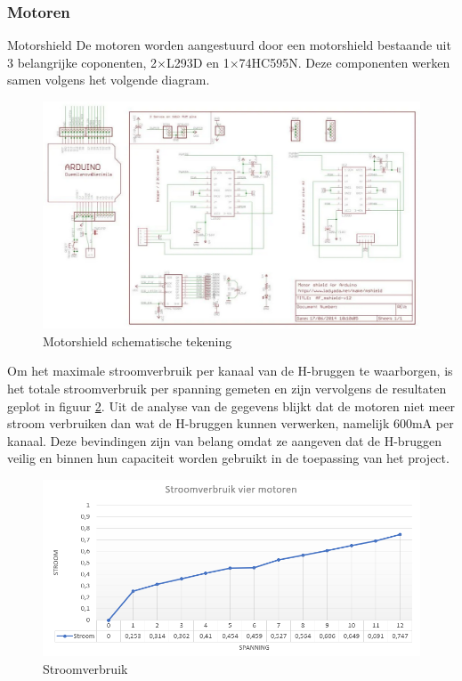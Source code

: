 \subsubsection{Motoren}
Motorshield
De motoren worden aangestuurd door een motorshield bestaande uit 3 belangrijke coponenten, 2×L293D\cite{h-brug} en 1×74HC595N\cite{shiftregister}. Deze componenten werken samen volgens het volgende diagram.
\begin{figure}[h]
    \centering
    \includegraphics[scale = 0.3]{Media/Figuren/Motorshield_SCHEM.png}
    \caption{Motorshield schematische tekening}
    \label{schematic-Motorshield}   
    \end{figure}

Om het maximale stroomverbruik per kanaal van de H-bruggen te waarborgen, is het totale stroomverbruik per spanning gemeten en zijn vervolgens de resultaten geplot in figuur \ref{Stroomverbruik}. Uit de analyse van de gegevens blijkt dat de motoren niet meer stroom verbruiken dan wat de H-bruggen kunnen verwerken, namelijk 600mA per kanaal. Deze bevindingen zijn van belang omdat ze aangeven dat de H-bruggen veilig en binnen hun capaciteit worden gebruikt in de toepassing van het project.

\begin{figure}[h]
    \centering
    \includegraphics[scale = 0.7]{Media/Figuren/Stroomverbruik.PNG}
    \caption{Stroomverbruik}
    \label{Stroomverbruik}
\end{figure}

